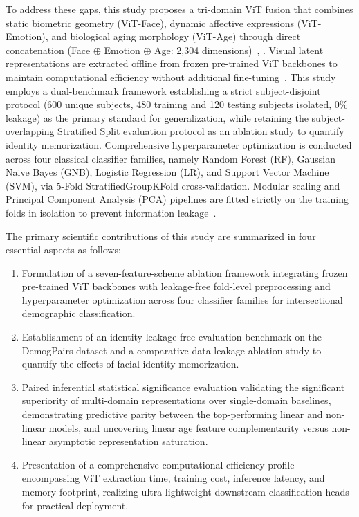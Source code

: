 To address these gaps, this study proposes a tri-domain ViT fusion that combines static biometric geometry (ViT-Face), dynamic affective expressions (ViT-Emotion), and biological aging morphology (ViT-Age) through direct concatenation (Face $\oplus$ Emotion $\oplus$ Age: 2,304 dimensions)~\cite{ref21}, \cite{ref22}. Visual latent representations are extracted offline from frozen pre-trained ViT backbones to maintain computational efficiency without additional fine-tuning~\cite{ref23}. This study employs a dual-benchmark framework establishing a strict subject-disjoint protocol (600 unique subjects, 480 training and 120 testing subjects isolated, 0\% leakage) as the primary standard for generalization, while retaining the subject-overlapping Stratified Split evaluation protocol as an ablation study to quantify identity memorization. Comprehensive hyperparameter optimization is conducted across four classical classifier families, namely Random Forest (RF), Gaussian Naive Bayes (GNB), Logistic Regression (LR), and Support Vector Machine (SVM), via 5-Fold StratifiedGroupKFold cross-validation. Modular scaling and Principal Component Analysis (PCA) pipelines are fitted strictly on the training folds in isolation to prevent information leakage~\cite{ref24}.

The primary scientific contributions of this study are summarized in four essential aspects as follows:
\begin{enumerate}
\item Formulation of a seven-feature-scheme ablation framework integrating frozen pre-trained ViT backbones with leakage-free fold-level preprocessing and hyperparameter optimization across four classifier families for intersectional demographic classification.
\item Establishment of an identity-leakage-free evaluation benchmark on the DemogPairs dataset and a comparative data leakage ablation study to quantify the effects of facial identity memorization.
\item Paired inferential statistical significance evaluation validating the significant superiority of multi-domain representations over single-domain baselines, demonstrating predictive parity between the top-performing linear and non-linear models, and uncovering linear age feature complementarity versus non-linear asymptotic representation saturation.
\item Presentation of a comprehensive computational efficiency profile encompassing ViT extraction time, training cost, inference latency, and memory footprint, realizing ultra-lightweight downstream classification heads for practical deployment.
\end{enumerate}

